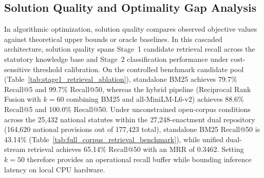 \subsection{Solution Quality and Optimality Gap Analysis}
\label{sec:optimality_gap}

In algorithmic optimization, solution quality compares observed objective values against theoretical upper bounds or oracle baselines. In this cascaded architecture, solution quality spans Stage~1 candidate retrieval recall across the statutory knowledge base and Stage~2 classification performance under cost-sensitive threshold calibration. On the controlled benchmark candidate pool (Table~\ref{tab:stage1_retrieval_ablation}), standalone BM25 achieves 79.7\% Recall@5 and 99.7\% Recall@50, whereas the hybrid pipeline (Reciprocal Rank Fusion with $k=60$ combining BM25 and all-MiniLM-L6-v2) achieves 88.6\% Recall@5 and 100.0\% Recall@50. Under unconstrained open-corpus conditions across the 25,432 national statutes within the 27,248-enactment dual repository (164,620 national provisions out of 177,423 total), standalone BM25 Recall@50 is 43.14\% (Table~\ref{tab:full_corpus_retrieval_benchmark}), while unified dual-stream retrieval achieves 65.14\% Recall@50 with an MRR of 0.3462. Setting $k=50$ therefore provides an operational recall buffer while bounding inference latency on local CPU hardware.


